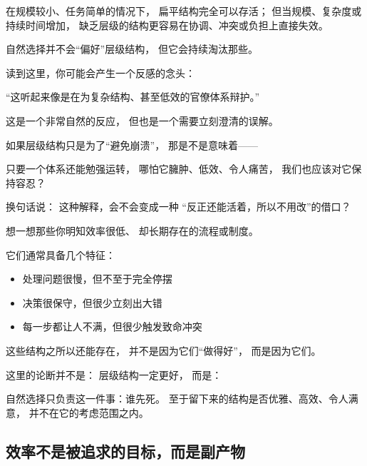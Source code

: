 \documentclass[../main.tex]{subfiles}
\begin{document}
在规模较小、任务简单的情况下，
扁平结构完全可以存活；
但当规模、复杂度或持续时间增加，
缺乏层级的结构更容易在协调、冲突或负担上直接失效。

自然选择并不会“偏好”层级结构，
但它会持续淘汰那些。




	\begin{tcolorbox}[colback=yellow!5, title=\textit{读者行为预测}]
		
	读到这里，你可能会产生一个反感的念头：
	
	“这听起来像是在为复杂结构、甚至低效的官僚体系辩护。”
	
	这是一个非常自然的反应，
	但也是一个需要立刻澄清的误解。
\end{tcolorbox}

\begin{readingnote}
	
	如果层级结构只是为了“避免崩溃”，
	那是不是意味着——
	
	只要一个体系还能勉强运转，
	哪怕它臃肿、低效、令人痛苦，
	我们也应该对它保持容忍？
	
	换句话说：
	这种解释，会不会变成一种
	“反正还能活着，所以不用改”的借口？
\end{readingnote}

\begin{readingnote}
	
	想一想那些你明知效率很低、
	却长期存在的流程或制度。
	
	它们通常具备几个特征：
	\begin{itemize}
		\item 处理问题很慢，但不至于完全停摆
		\item 决策很保守，但很少立刻出大错
		\item 每一步都让人不满，但很少触发致命冲突
	\end{itemize}
	
	这些结构之所以还能存在，
	并不是因为它们“做得好”，
	而是因为它们。
\end{readingnote}



这里的论断并不是：
层级结构一定更好，
而是：


自然选择只负责这一件事：谁先死。
至于留下来的结构是否优雅、高效、令人满意，
并不在它的考虑范围之内。

\subsection{效率不是被追求的目标，而是副产物}
\end{document}
